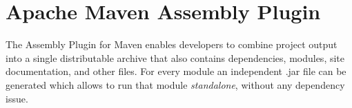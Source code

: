 \section{Apache Maven Assembly Plugin}
The Assembly Plugin for Maven enables developers to combine project output into 
a single distributable archive that also contains dependencies, modules, site 
documentation, and other files.
For every module an independent .jar file can be generated  which allows to run that module \textit{standalone}, without any dependency issue.

